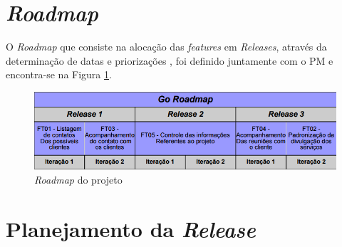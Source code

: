 \section{\textit{Roadmap}}

O \textit{Roadmap} que consiste na alocação das \textit{features} em \textit{Releases}, através da determinação de datas e priorizações \cite{safe}, foi 
definido juntamente com o PM e encontra-se na Figura \ref{roadmap}.

\begin{figure}[!htb]
\centering
\includegraphics[scale=0.6]{figuras/roadmap.png}
\caption{\textit{Roadmap} do projeto}
\label{roadmap}
\end{figure}

\section{Planejamento da \textit{Release}}
